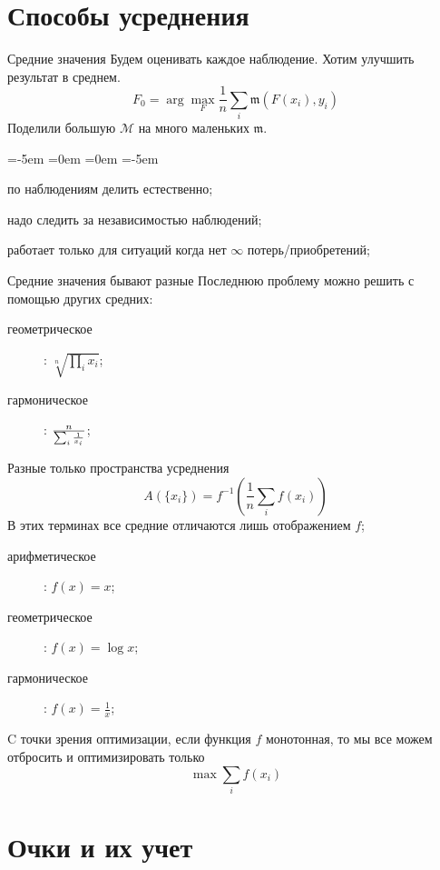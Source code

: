 \documentclass[14pt, fleqn, xcolor={dvipsnames, table}]{beamer}
\begin{document}
\section{Способы усреднения}

\begin{frame}{Средние значения}
Будем оценивать каждое наблюдение. Хотим улучшить результат в среднем.
$$
F_0 = \arg \max_F \frac{1}{n} \sum_i \mathfrak{m}(F(x_i),y_i)
$$
Поделили большую $\mathcal{M}$ на много маленьких $\mathfrak{m}$. 
\begin{description}
\small
\leftmargin=-5em
\itemindent=0em
=0em
\leftskip=-5em
  \item[\color{green}+] по наблюдениям делить естественно;
  \item[\color{red}---] надо следить за независимостью наблюдений;
  \item[\color{red}---] работает только для ситуаций когда нет $\infty$ потерь/приобретений;
\end{description} 
\end{frame}

\begin{frame}{Средние значения бывают разные}
Последнюю проблему можно решить с помощью других средних:

\begin{description}
  \item[геометрическое]: $\sqrt[n]{\prod_i x_i}$; 
  \item[гармоническое]: $n\over \sum_i \frac{1}{x_i}$;
\end{description}
\end{frame}

\begin{frame}{Разные только пространства усреднения}
$$
A(\{x_i\}) = f^{-1}\left(\frac{1}{n} \sum_i f(x_i)\right)
$$
В этих терминах все средние отличаются лишь отображением $f$;
\begin{description}
  \item[арифметическое]: $f(x) = x$; 
  \item[геометрическое]: $f(x) = \log x$; 
  \item[гармоническое]: $f(x) = \frac{1}{x}$; 
\end{description}
C точки зрения оптимизации, если функция $f$ монотонная, то мы все можем отбросить и оптимизировать только
$$
\max \sum_i f(x_i)
$$
\end{frame}

\section{Очки и их учет}
\end{document}
